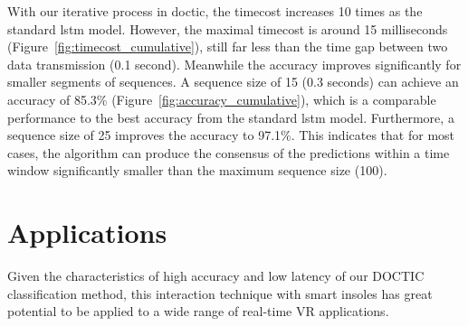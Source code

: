 \documentclass[review]{vgtc}                 %
\begin{document}
With our iterative process in \acs{doctic}, the timecost increases 10 times as the standard \acs{lstm} model.
However, the maximal timecost is around 15 milliseconds (Figure~\ref{fig:timecost_cumulative}), still far less than the time gap between two data transmission (0.1 second).
Meanwhile the accuracy improves significantly for smaller segments of sequences.
A sequence size of 15 (0.3 seconds) can achieve an accuracy of 85.3\% (Figure~\ref{fig:accuracy_cumulative}), which is a comparable performance to the best accuracy from the standard \acs{lstm} model.
Furthermore, a sequence size of 25 improves the accuracy to 97.1\%.
This indicates that for most cases, the algorithm can produce the consensus of the predictions within a time window significantly smaller than the maximum sequence size (100).











\section{Applications}
\label{sec:applications}
Given the characteristics of high accuracy and low latency of our DOCTIC classification method, this interaction technique with smart insoles  has great potential to be applied to a wide range of real-time VR applications.
\end{document}
